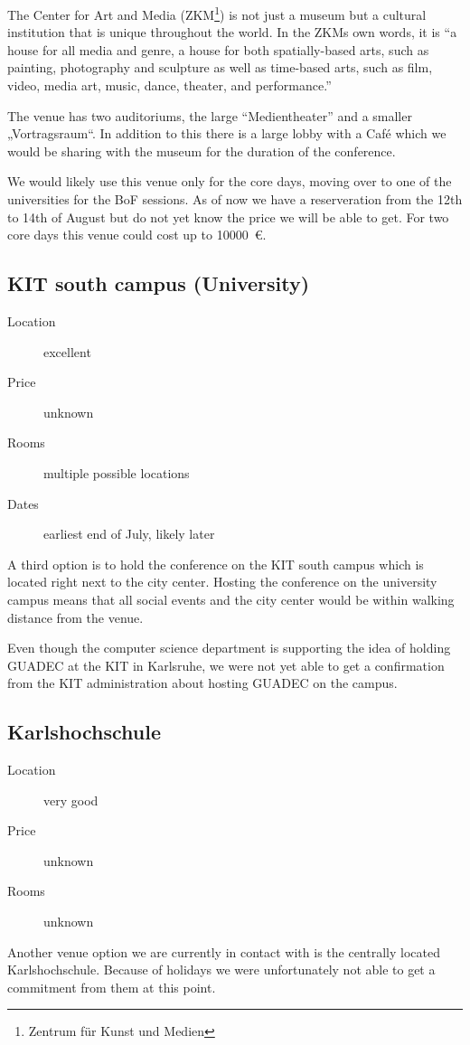 The Center for Art and Media (ZKM\footnote{Zentrum für Kunst und Medien}) is not
just a museum but a cultural institution that is unique throughout the world.
In the ZKMs own words, it is “a house for all media and genre, a house for both
spatially-based arts, such as painting, photography and sculpture as well as
time-based arts, such as film, video, media art, music, dance, theater, and performance.”

The venue has two auditoriums, the large “Medientheater” and a smaller
„Vortragsraum“. In addition to this there is a large lobby with a Café which we
would be sharing with the museum for the duration of the conference.

We would likely use this venue only for the core days, moving over to one of the
universities for the BoF sessions. As of now we have a reserveration from the
12th to 14th of August but do not yet know the price we will be able to get.
For two core days this venue could cost up to \SI{10000}{\euro}.


\subsection{KIT south campus (University)}
\begin{description}
\item[Location] excellent
\item[Price] unknown
\item[Rooms] multiple possible locations
\item[Dates] earliest end of July, likely later
\end{description}

A third option is to hold the conference on the KIT south campus which is
located right next to the city center. Hosting the conference on the university
campus means that all social events and the city center would be within walking
distance from the venue.

Even though the computer science department is supporting the idea of holding
GUADEC at the KIT in Karlsruhe, we were not yet able to get a confirmation from
the KIT administration about hosting GUADEC on the campus.

\subsection{Karlshochschule}
\begin{description}
\item[Location] very good
\item[Price] unknown
\item[Rooms] unknown
\end{description}

Another venue option we are currently in contact with is the centrally
located Karlshochschule. Because of holidays we were unfortunately not able
to get a commitment from them at this point.

